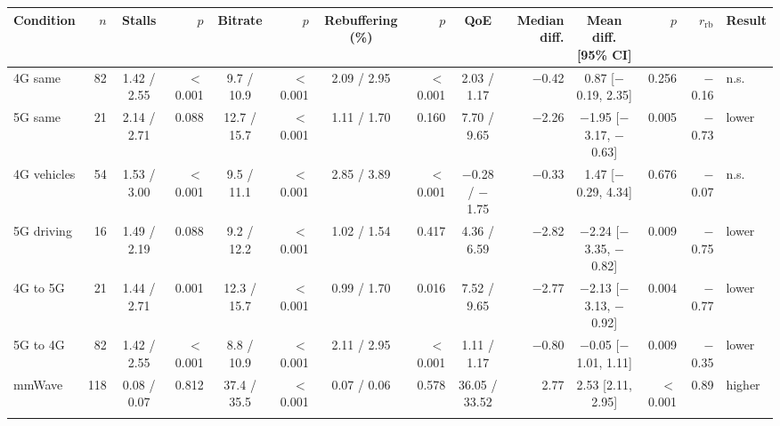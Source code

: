 \begin{tabular}{@{}lrcrcrcrcrcrrl@{}}
\toprule
Condition & $n$ & Stalls & $p$ & Bitrate & $p$ & Rebuffering (\%) & $p$ & QoE & Median diff. & Mean diff. [95\% CI] & $p$ & $r_{\mathrm{rb}}$ & Result \\
\midrule
4G same & 82 & 1.42 / 2.55 & $<$0.001 & 9.7 / 10.9 & $<$0.001 & 2.09 / 2.95 & $<$0.001 & 2.03 / 1.17 & $-$0.42 & 0.87 [$-$0.19, 2.35] & 0.256 & $-$0.16 & n.s. \\
5G same & 21 & 2.14 / 2.71 & 0.088 & 12.7 / 15.7 & $<$0.001 & 1.11 / 1.70 & 0.160 & 7.70 / 9.65 & $-$2.26 & $-$1.95 [$-$3.17, $-$0.63] & 0.005 & $-$0.73 & lower \\
4G vehicles & 54 & 1.53 / 3.00 & $<$0.001 & 9.5 / 11.1 & $<$0.001 & 2.85 / 3.89 & $<$0.001 & $-$0.28 / $-$1.75 & $-$0.33 & 1.47 [$-$0.29, 4.34] & 0.676 & $-$0.07 & n.s. \\
5G driving & 16 & 1.49 / 2.19 & 0.088 & 9.2 / 12.2 & $<$0.001 & 1.02 / 1.54 & 0.417 & 4.36 / 6.59 & $-$2.82 & $-$2.24 [$-$3.35, $-$0.82] & 0.009 & $-$0.75 & lower \\
4G to 5G & 21 & 1.44 / 2.71 & 0.001 & 12.3 / 15.7 & $<$0.001 & 0.99 / 1.70 & 0.016 & 7.52 / 9.65 & $-$2.77 & $-$2.13 [$-$3.13, $-$0.92] & 0.004 & $-$0.77 & lower \\
5G to 4G & 82 & 1.42 / 2.55 & $<$0.001 & 8.8 / 10.9 & $<$0.001 & 2.11 / 2.95 & $<$0.001 & 1.11 / 1.17 & $-$0.80 & $-$0.05 [$-$1.01, 1.11] & 0.009 & $-$0.35 & lower \\
mmWave & 118 & 0.08 / 0.07 & 0.812 & 37.4 / 35.5 & $<$0.001 & 0.07 / 0.06 & 0.578 & 36.05 / 33.52 & 2.77 & 2.53 [2.11, 2.95] & $<$0.001 & 0.89 & higher \\
\botrule
\end{tabular}
